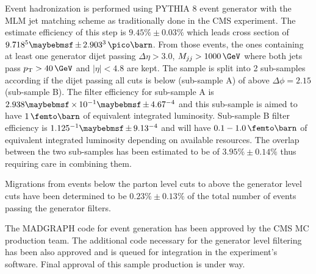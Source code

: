 Event hadronization is performed using \textsc{PYTHIA 8} event generator with the MLM jet matching scheme as traditionally done in the \gls{CMS} experiment. The estimate efficiency of this step is $9.45\% \pm 0.03\%$ which leads cross section of $9.718 \time 10^5 \pm 2.903 \time 10^3\,\pico\barn$. From those events, the ones containing at least one generator dijet passing $\Delta\eta > 3.0$, $M_{jj} > 1000\,\GeV$ where both jets pass $\pt > 40\,\GeV$ and $|\eta|<4.8$ are kept. The sample is split into 2 sub-samples according if the dijet passing all cuts is below (sub-sample A) of above $\Delta\phi=2.15$ (sub-sample B). The filter efficiency for sub-sample A is $2.938 \times 10^{-1} \pm 4.67 \time 10^{-4}$ and this sub-sample is aimed to have $1\,\femto\barn$ of equivalent integrated luminosity. Sub-sample B filter efficiency is $1.125 \time 10^{-1} \pm 9.13 \time 10^{-4}$ and will have $0.1-1.0\,\femto\barn$ of equivalent integrated luminosity depending on available resources. The overlap between the two sub-samples has been estimated to be of $3.95\% \pm 0.14\%$ thus requiring care in combining them.

Migrations from events below the parton level cuts to above the generator level cuts have been determined to be $0.23\% \pm 0.13\%$ of the total number of events passing the generator filters.

The \textsc{MADGRAPH} code for event generation has been approved by the \gls{CMS} \gls{MC} production team. The additional code necessary for the generator level filtering has been also approved and is queued for integration in the experiment's software. Final approval of this sample production is under way. 

